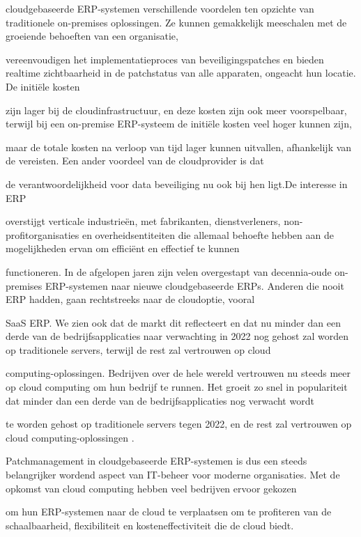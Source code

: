 cloudgebaseerde ERP-systemen verschillende voordelen ten opzichte van traditionele on-premises oplossingen. Ze kunnen gemakkelijk meeschalen met de groeiende behoeften van een organisatie, 

vereenvoudigen het implementatieproces van beveiligingspatches en bieden realtime zichtbaarheid in de patchstatus van alle apparaten, ongeacht hun locatie. De initiële kosten 

zijn lager bij de cloudinfrastructuur, en deze kosten zijn ook meer voorspelbaar, terwijl bij een on-premise ERP-systeem de initiële kosten veel hoger kunnen zijn, 

maar de totale kosten na verloop van tijd lager kunnen uitvallen, afhankelijk van de vereisten. Een ander voordeel van de cloudprovider is dat

de verantwoordelijkheid voor data beveiliging nu ook bij hen ligt.De interesse in ERP

overstijgt verticale industrieën, met fabrikanten, dienstverleners, non-profitorganisaties en overheidsentiteiten die allemaal behoefte hebben aan de mogelijkheden ervan om efficiënt en effectief te kunnen

functioneren. In de afgelopen jaren zijn velen overgestapt van decennia-oude on-premises ERP-systemen naar nieuwe cloudgebaseerde ERPs. Anderen die nooit ERP hadden, gaan rechtstreeks naar de cloudoptie, vooral 

SaaS ERP. We zien ook dat de markt dit reflecteert en dat nu minder dan een derde van de bedrijfsapplicaties naar verwachting in 2022 nog gehost zal worden op traditionele servers, terwijl de rest zal vertrouwen op cloud

computing-oplossingen. Bedrijven over de hele wereld vertrouwen nu steeds meer op cloud computing om hun bedrijf te runnen. Het groeit zo snel in populariteit dat minder dan een derde van de bedrijfsapplicaties nog verwacht wordt 

te worden gehost op traditionele servers tegen 2022, en de rest zal vertrouwen op cloud computing-oplossingen \autocite{Pimentel2017}.

Patchmanagement in cloudgebaseerde ERP-systemen is dus een steeds belangrijker wordend aspect van IT-beheer voor moderne organisaties. Met de opkomst van cloud computing hebben veel bedrijven ervoor gekozen

om hun ERP-systemen naar de cloud te verplaatsen om te profiteren van de schaalbaarheid, flexibiliteit en kosteneffectiviteit die de cloud biedt. 

